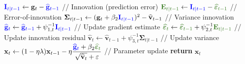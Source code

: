 \begin{algorithm}
\begin{algorithmic}
    \ELSE
    \STATE $\textcolor{blue}{\mathbf{I}_{t|t-1}} \gets \mathbf{g}_t - \textcolor{blue}{\widehat{\mathbf{g}}_{t-1}}$ \hfill // Innovation (prediction error)
    \STATE $\textcolor{OliveGreen}{\mathbf{E}_{t|t-1}} \gets \textcolor{blue}{\mathbf{I}_{t|t-1}} - \textcolor{OliveGreen}{\widehat{\bm{\varepsilon}}_{t-1}}$ \hfill // Error-of-innovation
    \STATE ${\bm{\Sigma}_{t|t-1}} \gets (\mathbf{g}_t + \beta_2 \textcolor{blue}{\mathbf{I}_{t|t-1}})^2 - \widehat{\mathbf{v}}_{t-1}$ \hfill // Variance innovation
    \STATE $\textcolor{blue}{\widehat{\mathbf{g}}_t} \gets \textcolor{blue}{\widehat{\mathbf{g}}_{t-1}} + \psi_{1,t}^{-1} \textcolor{blue}{\mathbf{I}_{t|t-1}}$ \hfill // Update gradient estimate
    \STATE $\textcolor{OliveGreen}{\widehat{\bm{\varepsilon}}_t} \gets \textcolor{OliveGreen}{\widehat{\bm{\varepsilon}}_{t-1}} + \psi_{2,t}^{-1} \textcolor{OliveGreen}{\mathbf{E}_{t|t-1}}$ \hfill // Update innovation residual
    \STATE $\widehat{\mathbf{v}}_t \gets \widehat{\mathbf{v}}_{t-1} + \psi_{3,t}^{-1} \bm{\Sigma}_{t|t-1}$ \hfill // Update variance
    \STATE $\mathbf{x}_t \gets (1 - \eta\lambda) \mathbf{x}_{t-1} - \eta \dfrac{\textcolor{blue}{\widehat{\mathbf{g}}_t} + \beta_2 \textcolor{OliveGreen}{\widehat{\bm{\varepsilon}}_t}}{\sqrt{\widehat{\mathbf{v}}_t} + \varepsilon}$ \hfill // Parameter update
    \ENDIF
\ENDFOR
\STATE \textbf{return} $\mathbf{x}_t$
\end{algorithmic}
\end{algorithm}